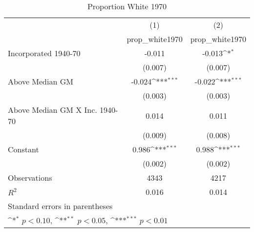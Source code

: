 \begin{table}[htbp]\centering
\def\sym#1{\ifmmode^{#1}\else\(^{#1}\)\fi}
\caption{Proportion White 1970}
\begin{tabular}{l*{2}{c}}
\hline\hline
                    &\multicolumn{1}{c}{(1)}&\multicolumn{1}{c}{(2)}\\
                    &\multicolumn{1}{c}{prop\_white1970}&\multicolumn{1}{c}{prop\_white1970}\\
\hline
Incorporated 1940-70&      -0.011         &      -0.013\sym{*}  \\
                    &     (0.007)         &     (0.007)         \\
[1em]
Above Median GM     &      -0.024\sym{***}&      -0.022\sym{***}\\
                    &     (0.003)         &     (0.003)         \\
[1em]
Above Median GM X Inc. 1940-70&       0.014         &       0.011         \\
                    &     (0.009)         &     (0.008)         \\
[1em]
Constant            &       0.986\sym{***}&       0.988\sym{***}\\
                    &     (0.002)         &     (0.002)         \\
\hline
Observations        &        4343         &        4217         \\
\(R^{2}\)           &       0.016         &       0.014         \\
\hline\hline
\multicolumn{3}{l}{\footnotesize Standard errors in parentheses}\\
\multicolumn{3}{l}{\footnotesize \sym{*} \(p<0.10\), \sym{**} \(p<0.05\), \sym{***} \(p<0.01\)}\\
\end{tabular}
\end{table}
